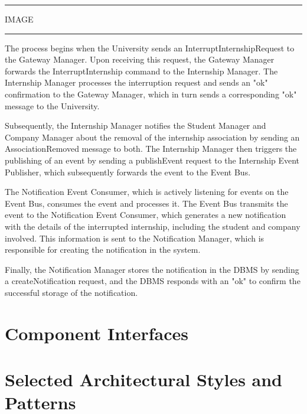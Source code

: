 \vspace{20pt}
\hrule
\vspace{10pt}
IMAGE
\vspace{10pt}
\hrule
\vspace{20pt}

The process begins when the University sends an InterruptInternshipRequest to the Gateway Manager. Upon receiving this request, the Gateway Manager forwards the InterruptInternship command to the Internship Manager. The Internship Manager processes the interruption request and sends an "ok" confirmation to the Gateway Manager, which in turn sends a corresponding "ok" message to the University.

Subsequently, the Internship Manager notifies the Student Manager and Company Manager about the removal of the internship association by sending an AssociationRemoved message to both. The Internship Manager then triggers the publishing of an event by sending a publishEvent request to the Internship Event Publisher, which subsequently forwards the event to the Event Bus.

The Notification Event Consumer, which is actively listening for events on the Event Bus, consumes the event and processes it. The Event Bus transmits the event to the Notification Event Consumer, which generates a new notification with the details of the interrupted internship, including the student and company involved. This information is sent to the Notification Manager, which is responsible for creating the notification in the system.

Finally, the Notification Manager stores the notification in the DBMS by sending a createNotification request, and the DBMS responds with an "ok" to confirm the successful storage of the notification.

\section{Component Interfaces}


\section{Selected Architectural Styles and Patterns}

